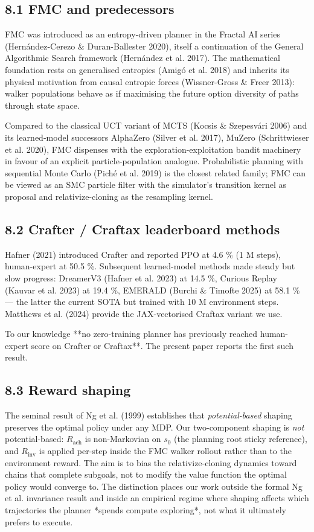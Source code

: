 \subsection{8.1 FMC and predecessors}

FMC was introduced as an entropy-driven planner in the Fractal AI
series (Hernández-Cerezo \& Duran-Ballester 2020), itself a continuation
of the General Algorithmic Search framework (Hernández et al. 2017).
The mathematical foundation rests on generalised entropies (Amigó et
al. 2018) and inherits its physical motivation from causal entropic
forces (Wissner-Gross \& Freer 2013): walker populations behave as if
maximising the future option diversity of paths through state space.

Compared to the classical UCT variant of MCTS (Kocsis \& Szepesvári
2006) and its learned-model successors AlphaZero (Silver et al. 2017),
MuZero (Schrittwieser et al. 2020), FMC dispenses with the
exploration-exploitation bandit machinery in favour of an explicit
particle-population analogue. Probabilistic planning with sequential
Monte Carlo (Piché et al. 2019) is the closest related family; FMC
can be viewed as an SMC particle filter with the simulator's transition
kernel as proposal and relativize-cloning as the resampling kernel.

\subsection{8.2 Crafter / Craftax leaderboard methods}

Hafner (2021) introduced Crafter and reported PPO at 4.6 \% (1 M steps),
human-expert at 50.5 \%. Subsequent learned-model methods made steady
but slow progress: DreamerV3 (Hafner et al. 2023) at 14.5 \%, Curious
Replay (Kauvar et al. 2023) at 19.4 \%, EMERALD (Burchi \& Timofte 2025) at
58.1 \% — the latter the current SOTA but trained with 10 M
environment steps. Matthews et al. (2024) provide the JAX-vectorised
Craftax variant we use.

To our knowledge **no zero-training planner has previously reached
human-expert score on Crafter or Craftax**. The present paper reports
the first such result.

\subsection{8.3 Reward shaping}

The seminal result of Ng et al. (1999) establishes that \emph{potential-based}
shaping preserves the optimal policy under any MDP. Our two-component
shaping is \emph{not} potential-based: $R_{\text{ach}}$ is non-Markovian on
$s_0$ (the planning root sticky reference), and $R_{\text{inv}}$ is
applied per-step inside the FMC walker rollout rather than to the
environment reward. The aim is to bias the relativize-cloning dynamics
toward chains that complete subgoals, not to modify the value function
the optimal policy would converge to. The distinction places our work
outside the formal Ng et al. invariance result and inside an empirical
regime where shaping affects which trajectories the planner *spends
compute exploring*, not what it ultimately prefers to execute.


